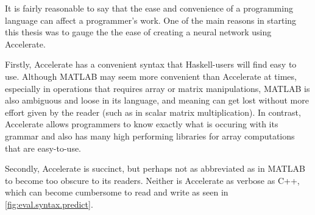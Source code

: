 It is fairly reasonable to say that the ease and convenience of a programming language can affect a programmer's work. One of the main reasons in starting this thesis was to gauge the the ease of creating a neural network using Accelerate.

Firstly, Accelerate has a convenient syntax that Haskell-users will find easy to use. Although MATLAB may seem more convenient than Accelerate at times, especially in operations that requires array or matrix manipulations, MATLAB is also ambiguous and loose in its language, and meaning can get lost without more effort given by the reader (such as in scalar matrix multiplication). In contrast, Accelerate allows programmers to know exactly what is occuring with its grammar and also has many high performing libraries for array computations that are easy-to-use.

Secondly, Accelerate is succinct, but perhaps not as abbreviated as in MATLAB to become too obscure to its readers. Neither is Accelerate as verbose as C++, which can become cumbersome to read and write as seen in \ref{fig:eval.syntax.predict}.

